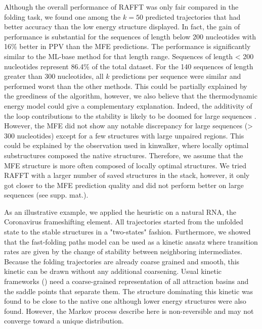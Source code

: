 \documentclass[a4paper,12pt]{article}
\begin{document}
Although the overall performance of RAFFT was only fair compared in the folding
task, we found one among the \(k=50\) predicted trajectories that had better
accuracy than the low energy structure displayed. In fact, the gain of
performance is substantial for the sequences of length below 200 nucleotides
with 16\% better in PPV than the MFE predictions. The performance is
significantly similar to the ML-base method for that length range. Sequences of
length \textless{} 200 nucleotides represent 86.4\% of the total dataset. For the 140
sequences of length greater than 300 nucleotides, all \(k\) predictions per
sequence were similar and performed worst than the other methods. This could be
partially explained by the greediness of the algorithm, however, we also believe
that the thermodynamic energy model could give a complementary explanation.
Indeed, the additivity of the loop contributions to the stability is likely to
be doomed for large sequences \cite{tinoco99_how_rna_folds}. However, the MFE did
not show any notable discrepancy for large sequences (\textgreater{} 300 nucleotides)
except for a few structures with large unpaired regions. This could be explained
by the observation used in kinwalker, where locally optimal substructures
composed the native structures. Therefore, we assume that the MFE structure is
more often composed of locally optimal structures. We tried RAFFT with a larger
number of saved structures in the stack, however, it only got closer to the MFE
prediction quality and did not perform better on large sequences (see supp.
mat.).

As an illustrative example, we applied the heuristic on a natural RNA, the
Coronavirus frameshifting element. All trajectories started from the unfolded
state to the stable structures in a "two-states" fashion. Furthermore, we showed
that the fast-folding paths model can be used as a kinetic ansatz where
transition rates are given by the change of stability between neighboring
intermediates. Because the folding trajectories are already coarse grained and
smooth, this kinetic can be drawn without any additional coarsening. Usual
kinetic frameworks (\cite{lorenz20_effic_comput_base_probab_multi_rna_foldin})
need a coarse-grained representation of all attraction basins and the saddle
points that separate them. The structure dominating this kinetic was found to be
close to the native one although lower energy structures were also found.
However, the Markov process describe here is non-reversible and may not converge
toward a unique distribution.
\end{document}
